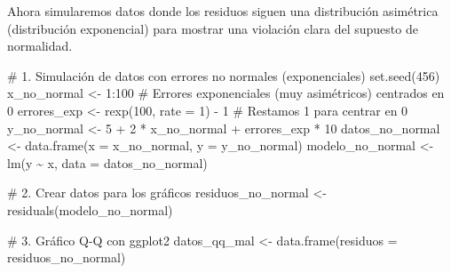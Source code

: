 \documentclass[
  letterpaper,
  DIV=11,
  numbers=noendperiod]{scrreprt}
\newenvironment{Shaded}{\begin{snugshade}}{\end{snugshade}}
\newcommand{\AttributeTok}[1]{\textcolor[rgb]{0.40,0.45,0.13}{#1}}
\newcommand{\CommentTok}[1]{\textcolor[rgb]{0.37,0.37,0.37}{#1}}
\newcommand{\DecValTok}[1]{\textcolor[rgb]{0.68,0.00,0.00}{#1}}
\newcommand{\FunctionTok}[1]{\textcolor[rgb]{0.28,0.35,0.67}{#1}}
\newcommand{\NormalTok}[1]{\textcolor[rgb]{0.00,0.23,0.31}{#1}}
\newcommand{\OtherTok}[1]{\textcolor[rgb]{0.00,0.23,0.31}{#1}}
\newcommand{\SpecialCharTok}[1]{\textcolor[rgb]{0.37,0.37,0.37}{#1}}
\begin{document}
\begin{tcolorbox}[enhanced jigsaw, breakable, toprule=.15mm, bottomtitle=1mm, coltitle=black, colbacktitle=quarto-callout-tip-color!10!white, titlerule=0mm, opacitybacktitle=0.6, bottomrule=.15mm, toptitle=1mm, title=\textcolor{quarto-callout-tip-color}{\faLightbulb}\hspace{0.5em}{Contraejemplo: Violación del supuesto de normalidad}, arc=.35mm, rightrule=.15mm, opacityback=0, colframe=quarto-callout-tip-color-frame, leftrule=.75mm, left=2mm, colback=white]

Ahora simularemos datos donde los residuos siguen una distribución
asimétrica (distribución exponencial) para mostrar una violación clara
del supuesto de normalidad.

\begin{Shaded}
\begin{Highlighting}[]
\CommentTok{\# 1. Simulación de datos con errores no normales (exponenciales)}
\FunctionTok{set.seed}\NormalTok{(}\DecValTok{456}\NormalTok{)}
\NormalTok{x\_no\_normal }\OtherTok{\textless{}{-}} \DecValTok{1}\SpecialCharTok{:}\DecValTok{100}
\CommentTok{\# Errores exponenciales (muy asimétricos) centrados en 0}
\NormalTok{errores\_exp }\OtherTok{\textless{}{-}} \FunctionTok{rexp}\NormalTok{(}\DecValTok{100}\NormalTok{, }\AttributeTok{rate =} \DecValTok{1}\NormalTok{) }\SpecialCharTok{{-}} \DecValTok{1}  \CommentTok{\# Restamos 1 para centrar en 0}
\NormalTok{y\_no\_normal }\OtherTok{\textless{}{-}} \DecValTok{5} \SpecialCharTok{+} \DecValTok{2} \SpecialCharTok{*}\NormalTok{ x\_no\_normal }\SpecialCharTok{+}\NormalTok{ errores\_exp }\SpecialCharTok{*} \DecValTok{10}
\NormalTok{datos\_no\_normal }\OtherTok{\textless{}{-}} \FunctionTok{data.frame}\NormalTok{(}\AttributeTok{x =}\NormalTok{ x\_no\_normal, }\AttributeTok{y =}\NormalTok{ y\_no\_normal)}
\NormalTok{modelo\_no\_normal }\OtherTok{\textless{}{-}} \FunctionTok{lm}\NormalTok{(y }\SpecialCharTok{\textasciitilde{}}\NormalTok{ x, }\AttributeTok{data =}\NormalTok{ datos\_no\_normal)}

\CommentTok{\# 2. Crear datos para los gráficos}
\NormalTok{residuos\_no\_normal }\OtherTok{\textless{}{-}} \FunctionTok{residuals}\NormalTok{(modelo\_no\_normal)}

\CommentTok{\# 3. Gráfico Q{-}Q con ggplot2}
\NormalTok{datos\_qq\_mal }\OtherTok{\textless{}{-}} \FunctionTok{data.frame}\NormalTok{(}\AttributeTok{residuos =}\NormalTok{ residuos\_no\_normal)}


\end{Highlighting}
\end{Shaded}
\end{tcolorbox}
\end{document}
